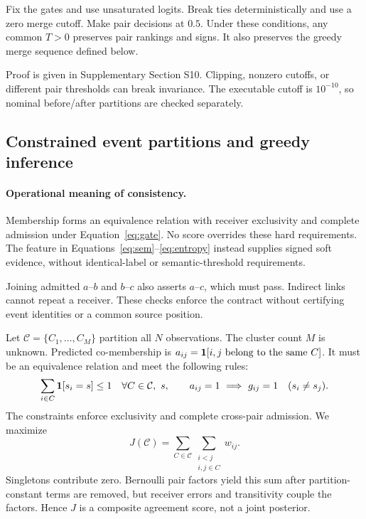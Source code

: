 \begin{Proposition}\label{prop:temperature}
Fix the gates and use unsaturated logits. Break ties deterministically and use a zero merge cutoff. Make pair decisions at $0.5$. Under these conditions, any common $T>0$ preserves pair rankings and signs. It also preserves the greedy merge sequence defined below.
\end{Proposition}
Proof is given in Supplementary Section S10.
Clipping, nonzero cutoffs, or different pair thresholds can break invariance. The executable cutoff is $10^{-10}$, so nominal before/after partitions are checked separately.

\subsection{Constrained event partitions and greedy inference}
\paragraph{Operational meaning of consistency.}
Membership forms an equivalence relation with receiver exclusivity and complete admission under Equation~\eqref{eq:gate}. No score overrides these hard requirements. The feature in Equations~\eqref{eq:sem}--\eqref{eq:entropy} instead supplies signed soft evidence, without identical-label or semantic-threshold requirements.

Joining admitted $a$--$b$ and $b$--$c$ also asserts $a$--$c$, which must pass. Indirect links cannot repeat a receiver. These checks enforce the contract without certifying event identities or a common source position.

Let $\mathcal C=\{C_1,\ldots,C_M\}$ partition all $N$ observations. The cluster count $M$ is unknown. Predicted co-membership is $a_{ij}=\mathbf{1}[i,j\text{ belong to the same }C]$. It must be an equivalence relation and meet the following rules:
\begin{equation}
 \sum_{i\in C}\mathbf{1}[s_i=s]\leq1\quad\forall C\in\mathcal C,\ s,
 \qquad a_{ij}=1\ \Longrightarrow\ g_{ij}=1\quad(s_i\ne s_j).\label{eq:receiver}
\end{equation}
The constraints enforce exclusivity and complete cross-pair admission. We maximize
\begin{equation}
 J(\mathcal C)=\sum_{C\in\mathcal C}\sum_{\substack{i<j\\i,j\in C}}w_{ij}.\label{eq:objective}
\end{equation}
Singletons contribute zero. Bernoulli pair factors yield this sum after partition-constant terms are removed, but receiver errors and transitivity couple the factors. Hence $J$ is a composite agreement score, not a joint posterior.

